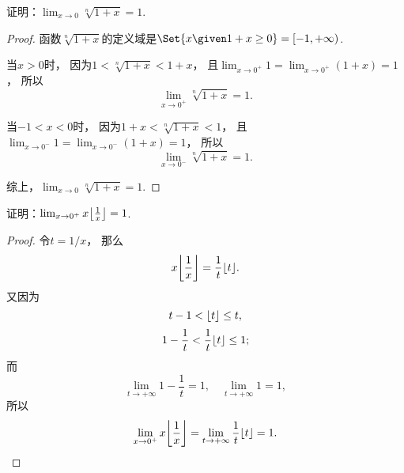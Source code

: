\begin{example}
证明：\(\lim_{x\to0} \sqrt[n]{1+x} = 1\).
\begin{proof}
函数\(\sqrt[n]{1+x}\)的定义域是\(\Set{ x \given 1+x\geq 0 } = [-1,+\infty)\).

当\(x > 0\)时，
因为\(1 < \sqrt[n]{1+x} < 1+x\)，
且\(\lim_{x\to0^+} 1 = \lim_{x\to0^+}(1+x) = 1\)，
所以\[
	\lim_{x\to0^+} \sqrt[n]{1+x} = 1.
\]

当\(-1 < x < 0\)时，
因为\(1+x < \sqrt[n]{1+x} < 1\)，
且\(\lim_{x\to0^-} 1 = \lim_{x\to0^-}(1+x) = 1\)，
所以\[
	\lim_{x\to0^-} \sqrt[n]{1+x} = 1.
\]

综上，\(\lim_{x\to0} \sqrt[n]{1+x} = 1\).
\end{proof}
\end{example}

\begin{example}
证明：\(\lim_{x\to0^+} x \floor*{\frac1x} = 1\).
\begin{proof}
令\(t=1/x\)，
那么\[
	x \floor*{\frac1x} = \frac{1}{t} \floor{t}.
\]
又因为\[
	t - 1 < \lfloor t\rfloor \leq t,
\]\[
	1 - \frac{1}{t} < \frac{1}{t} \lfloor t\rfloor \leq 1;
\]
而\[
	\lim_{t\to+\infty} 1 - \frac{1}{t} = 1,
	\quad
	\lim_{t\to+\infty} 1 = 1,
\]
所以\[
	\lim_{x\to0^+} x \floor*{\frac1x} = \lim_{t\to+\infty} \frac{1}{t} \floor{t} = 1.
	\qedhere
\]
\end{proof}
\end{example}


